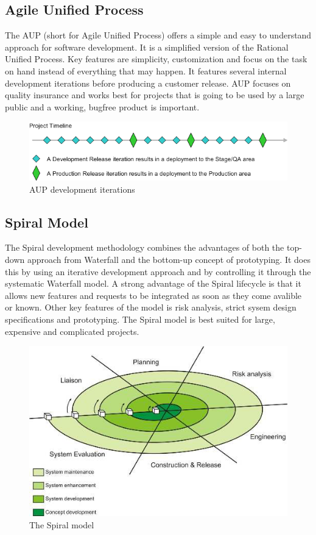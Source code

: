 \subsection{Agile Unified Process}
The AUP (short for Agile Unified Process) offers a simple and easy to understand approach for software
development. It is a simplified version of the Rational Unified Process. Key features are simplicity, 
customization and focus on the task on hand instead of everything that may happen. It features
several internal development iterations before producing a customer release. AUP focuses on quality
insurance and works best for projects that is going to be used by a large public and a working, bugfree
product is important.
\begin{figure}[h!]
\centering \includegraphics[scale=0.65]{img/designmodel-aup} \caption{AUP development iterations}
\label{fig:desigmodel-aupl}
\end{figure}

\subsection{Spiral Model}
The Spiral development methodology combines the advantages of both the top-down approach from 
Waterfall and the bottom-up concept of prototyping. It does this by using an iterative development
approach and by controlling it through the systematic Waterfall model. A strong advantage of the Spiral lifecycle is that it
allows new features and requests to be integrated as soon as they come avalible or known. Other key 
features of the model is risk analysis, strict sysem design specifications and prototyping. The Spiral model
 is best suited for large, expensive and complicated projects.
\begin{figure}[h!]
\centering \includegraphics[scale=0.85]{img/designmodel-spiral} \caption{The Spiral model}
\label{fig:desigmodel-spiral}
\end{figure}

